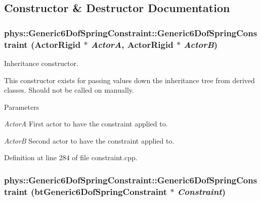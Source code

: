 \subsection{Constructor \& Destructor Documentation}
\hypertarget{classphys_1_1Generic6DofSpringConstraint_a88cf5bfb5db55b957652831c3295b56a}{
\subsubsection[{Generic6DofSpringConstraint}]{\setlength{\rightskip}{0pt plus 5cm}phys::Generic6DofSpringConstraint::Generic6DofSpringConstraint ({\bf ActorRigid} $\ast$ {\em ActorA}, \/  {\bf ActorRigid} $\ast$ {\em ActorB})}}
\label{d1/dc7/classphys_1_1Generic6DofSpringConstraint_a88cf5bfb5db55b957652831c3295b56a}


Inheritance constructor. 

This constructor exists for passing values down the inheritance tree from derived classes. Should not be called on manually. 
\begin{DoxyParams}{Parameters}
\item[{\em ActorA}]First actor to have the constraint applied to. \item[{\em ActorB}]Second actor to have the constraint applied to. \end{DoxyParams}


Definition at line 284 of file constraint.cpp.

\hypertarget{classphys_1_1Generic6DofSpringConstraint_aecd43f6209799587aacee584d3840491}{
\subsubsection[{Generic6DofSpringConstraint}]{\setlength{\rightskip}{0pt plus 5cm}phys::Generic6DofSpringConstraint::Generic6DofSpringConstraint (btGeneric6DofSpringConstraint $\ast$ {\em Constraint})}}
\label{d1/dc7/classphys_1_1Generic6DofSpringConstraint_aecd43f6209799587aacee584d3840491}


